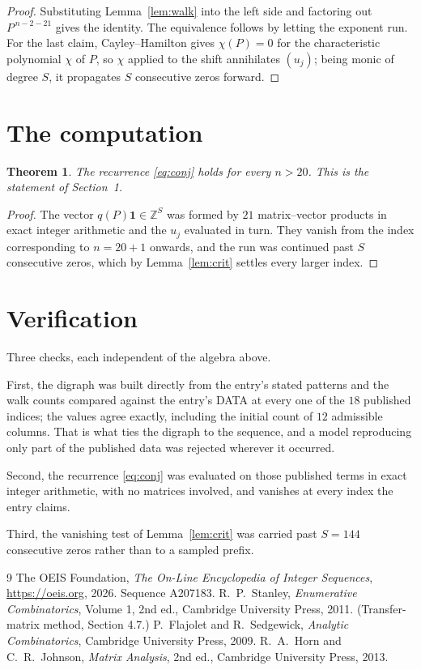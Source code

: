 \documentclass[11pt,a4paper]{article}
\theoremstyle{plain}
\newtheorem{theorem}{Theorem}
\theoremstyle{definition}
\begin{document}
\begin{proof}
Substituting Lemma~\ref{lem:walk} into the left side and factoring out
$P^{\,n-2-21}$ gives the identity. The equivalence follows by letting the exponent
run. For the last claim, Cayley--Hamilton gives $\chi(P)=0$ for the characteristic
polynomial $\chi$ of $P$, so $\chi$ applied to the shift annihilates $(u_j)$; being monic of
degree $S$, it propagates $S$ consecutive zeros forward.
\end{proof}

\section{The computation}

\begin{theorem}
The recurrence \eqref{eq:conj} holds for every $n>20$. This is the statement of
Section~1.
\end{theorem}

\begin{proof}
The vector $q(P)\mathbf{1}\in\mathbb{Z}^{S}$ was formed by $21$ matrix--vector
products in exact integer arithmetic and the $u_j$ evaluated in turn. They vanish from the
index corresponding to $n=20+1$ onwards, and the run was continued past $S$ consecutive
zeros, which by Lemma~\ref{lem:crit} settles every larger index.
\end{proof}

\section{Verification}

Three checks, each independent of the algebra above.

First, the digraph was built directly from the entry's stated patterns and the walk counts
compared against the entry's DATA at every one of the $18$ published indices; the
values agree exactly, including the initial count of $12$ admissible columns. That is
what ties the digraph to the sequence, and a model reproducing only part of the published
data was rejected wherever it occurred.

Second, the recurrence \eqref{eq:conj} was evaluated on those published terms in exact
integer arithmetic, with no matrices involved, and vanishes at every index the entry claims.

Third, the vanishing test of Lemma~\ref{lem:crit} was carried past $S=144$ consecutive
zeros rather than to a sampled prefix.

\begin{thebibliography}{9}
 The OEIS Foundation, \emph{The On-Line Encyclopedia of Integer
Sequences}, \url{https://oeis.org}, 2026. Sequence A207183.
 R.~P.~Stanley, \emph{Enumerative Combinatorics}, Volume 1, 2nd ed.,
Cambridge University Press, 2011. (Transfer-matrix method, Section 4.7.)
 P.~Flajolet and R.~Sedgewick, \emph{Analytic Combinatorics}, Cambridge
University Press, 2009.
 R.~A.~Horn and C.~R.~Johnson, \emph{Matrix Analysis}, 2nd ed., Cambridge
University Press, 2013.
\end{thebibliography}
\end{document}
